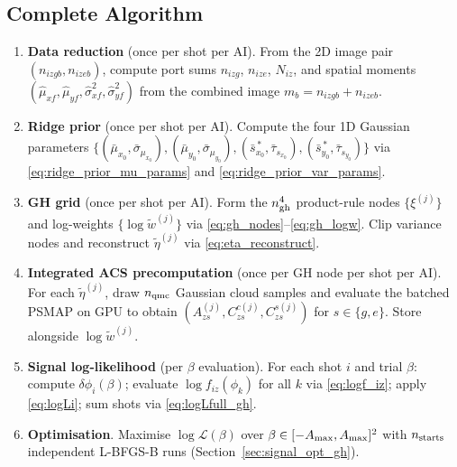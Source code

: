 \documentclass[11pt,a4paper]{article}
\begin{document}
\subsection{Complete Algorithm}
\label{sec:gh_algorithm}

\begin{enumerate}

\item \textbf{Data reduction} (once per shot per AI).
  From the 2D image pair $(n_{izgb},n_{izeb})$, compute port sums
  $n_{izg}$, $n_{ize}$, $N_{iz}$, and spatial moments
  $(\hat\mu_{xf},\hat\mu_{yf},\hat\sigma^2_{xf},\hat\sigma^2_{yf})$
  from the combined image $m_b=n_{izgb}+n_{izeb}$.

\item \textbf{Ridge prior} (once per shot per AI).
  Compute the four 1D Gaussian parameters
  $\{(\bar\mu_{x_0},\bar\sigma_{\mu_{x_0}}),(\bar\mu_{y_0},\bar\sigma_{\mu_{y_0}}),
  (\bar s^{\,*}_{x_0},\bar\tau_{s_{x_0}}),(\bar s^{\,*}_{y_0},\bar\tau_{s_{y_0}})\}$
  via \eqref{eq:ridge_prior_mu_params} and \eqref{eq:ridge_prior_var_params}.

\item \textbf{GH grid} (once per shot per AI).
  Form the $n_{\rm gh}^4$ product-rule nodes $\{\xi^{(j)}\}$ and
  log-weights $\{\log\tilde w^{(j)}\}$ via \eqref{eq:gh_nodes}--\eqref{eq:gh_logw}.
  Clip variance nodes and reconstruct $\tilde\eta^{(j)}$ via \eqref{eq:eta_reconstruct}.

\item \textbf{Integrated ACS precomputation} (once per GH node per shot per AI).
  For each $\tilde\eta^{(j)}$, draw $n_{\rm qmc}$ Gaussian cloud samples and
  evaluate the batched PSMAP on GPU to obtain
  $(A^{(j)}_{zs},C^{c(j)}_{zs},C^{s(j)}_{zs})$ for $s\in\{g,e\}$.
  Store alongside $\log\tilde w^{(j)}$.

\item \textbf{Signal log-likelihood} (per $\beta$ evaluation).
  For each shot $i$ and trial $\beta$: compute $\delta\phi_i(\beta)$;
  evaluate $\log f_{iz}(\phi_k)$ for all $k$ via \eqref{eq:logf_iz};
  apply \eqref{eq:logLi}; sum shots via \eqref{eq:logLfull_gh}.

\item \textbf{Optimisation}.
  Maximise $\log\mathcal{L}(\beta)$ over $\beta\in[-A_{\rm max},A_{\rm max}]^2$
  with $n_{\rm starts}$ independent L-BFGS-B runs
  (Section~\ref{sec:signal_opt_gh}).

\end{enumerate}
\end{document}

